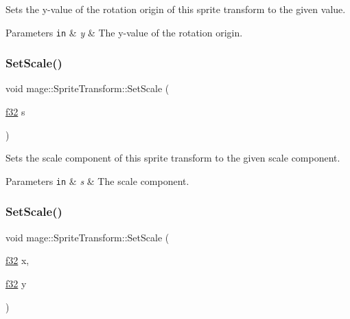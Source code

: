 Sets the y-\/value of the rotation origin of this sprite transform to the given value.


\begin{DoxyParams}[1]{Parameters}
\mbox{\tt in}  & {\em y} & The y-\/value of the rotation origin. \\
\hline
\end{DoxyParams}
\hypertarget{structmage_1_1_sprite_transform_aff63b2be61c34a30d9b18b96dffebc36}{}\label{structmage_1_1_sprite_transform_aff63b2be61c34a30d9b18b96dffebc36} 
\subsubsection{\texorpdfstring{Set\+Scale()}{SetScale()}\hspace{0.1cm}{\footnotesize\ttfamily [1/4]}}
{\footnotesize\ttfamily void mage\+::\+Sprite\+Transform\+::\+Set\+Scale (\begin{DoxyParamCaption}\item[{\hyperlink{namespacemage_a6a44ad388483959dc4dff9f2aef91431}{f32}}]{s }\end{DoxyParamCaption})\hspace{0.3cm}{\ttfamily [noexcept]}}

Sets the scale component of this sprite transform to the given scale component.


\begin{DoxyParams}[1]{Parameters}
\mbox{\tt in}  & {\em s} & The scale component. \\
\hline
\end{DoxyParams}
\hypertarget{structmage_1_1_sprite_transform_a100af807ca1f6f690594d8f29a2b1a05}{}\label{structmage_1_1_sprite_transform_a100af807ca1f6f690594d8f29a2b1a05} 
\subsubsection{\texorpdfstring{Set\+Scale()}{SetScale()}\hspace{0.1cm}{\footnotesize\ttfamily [2/4]}}
{\footnotesize\ttfamily void mage\+::\+Sprite\+Transform\+::\+Set\+Scale (\begin{DoxyParamCaption}\item[{\hyperlink{namespacemage_a6a44ad388483959dc4dff9f2aef91431}{f32}}]{x,  }\item[{\hyperlink{namespacemage_a6a44ad388483959dc4dff9f2aef91431}{f32}}]{y }\end{DoxyParamCaption})\hspace{0.3cm}{\ttfamily [noexcept]}}

